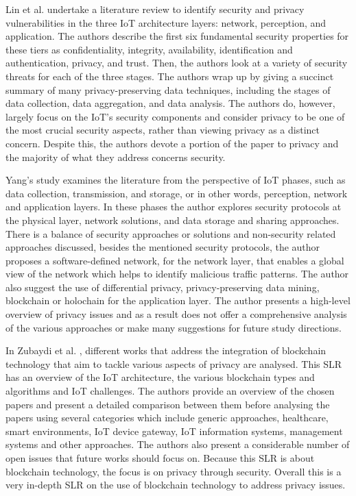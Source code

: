 Lin et al. \cite{LinSurvey} undertake a literature review to identify security
and privacy vulnerabilities in the three IoT architecture layers: network,
perception, and application. The authors describe the first six fundamental
security properties for these tiers as confidentiality, integrity, availability,
identification and authentication, privacy, and trust. Then, the authors
look at a variety of security threats for each of the three stages. The
authors wrap up by giving a succinct summary of many privacy-preserving
data techniques, including the stages of data collection, data aggregation,
and data analysis. The authors do, however, largely focus on the IoT's security
components and consider privacy to be one of the most crucial security aspects,
rather than viewing privacy as a distinct concern. Despite this, the authors
devote a portion of the paper to privacy and the majority of what they address
concerns security.

Yang's study \cite{yang2022overview} examines the literature from the perspective
of IoT phases, such as data collection, transmission, and storage, or in other
words, perception, network and application layers. In these phases the author explores
security protocols at the physical layer, network solutions, and data storage and
sharing approaches. There is a balance of security approaches or solutions and
non-security related approaches discussed, besides the mentioned security protocols,
the author proposes a software-defined network, for the network layer, that enables
a global view of the network which helps to identify malicious traffic patterns. The
author also suggest the use of differential privacy, privacy-preserving data mining,
blockchain or holochain for the application layer. The author presents a high-level
overview of privacy issues and as a result does not offer a comprehensive analysis of
the various approaches or make many suggestions for future study directions.

In Zubaydi et al. \cite{zubaydi2023leveraging}, different works that address the
integration of blockchain technology that aim to tackle various aspects of privacy
are analysed. This SLR has an overview of the IoT architecture, the various blockchain
types and algorithms and IoT challenges. The authors provide an overview of the
chosen papers and present a detailed comparison between them before analysing
the papers using several categories which include generic approaches, healthcare,
smart environments, IoT device gateway, IoT information systems, management systems
and other approaches. The authors also present a considerable number of open issues
that future works should focus on. Because this SLR is about blockchain technology,
the focus is on privacy through security. Overall this is a very in-depth SLR on the
use of blockchain technology to address privacy issues.

